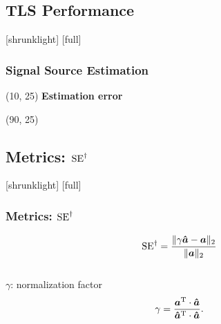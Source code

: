 \subsection{TLS Performance}
[shrunklight]
[full]
\begin{frame}[t]
\frametitle{Signal Source Estimation} 
	\begin{textblock}{80}(10, 25)
		\textbf{Estimation error}\\%
		
	\end{textblock}
	\begin{textblock}{80}(90, 25)
		\centering
	\end{textblock}	 
\end{frame}

\subsection{Metrics: $\operatorname{SE}^{\dagger}$} 
[shrunklight]
[full]
\begin{frame}
\frametitle{Metrics: $\operatorname{SE}^{\dagger}$}
	\begin{equation*}
	\operatorname{SE}^{\dagger} = \frac{ \| \gamma \bm{\hat{a}} - \bm{a} \|_{2}}{\| \bm{a} \|_{2}}
	\end{equation*}\\
	\vspace*{0.5cm}
	$\gamma$: normalization factor \\
	\begin{equation*}
	\gamma = \frac{\bm{a}^{\operatorname{T}} \cdot \bm{\hat{a}}}{\bm{\hat{a}}^{\operatorname{T}} \cdot \bm{\hat{a}}}.
	\end{equation*}
\end{frame}


